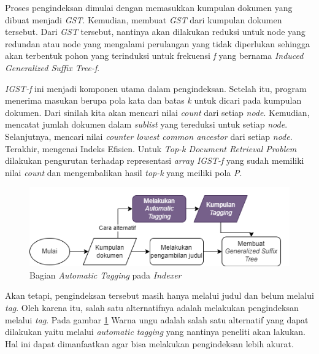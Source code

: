 
Proses pengindeksan dimulai dengan memasukkan kumpulan dokumen yang dibuat menjadi \textit{GST}. Kemudian, membuat \textit{GST} dari kumpulan dokumen tersebut. Dari \textit{GST} tersebut, nantinya akan dilakukan reduksi untuk node yang redundan atau node yang mengalami perulangan yang tidak diperlukan sehingga akan terbentuk pohon yang terinduksi untuk frekuensi \textit{f} yang bernama \textit{Induced Generalized Suffix Tree-f}. 

\textit{IGST-f}  ini menjadi komponen utama dalam pengindeksan. Setelah itu, program menerima masukan berupa pola kata dan batas \textit{k} untuk dicari pada kumpulan dokumen. Dari sinilah kita akan mencari nilai \textit{count} dari setiap \textit{node}. Kemudian, mencatat jumlah dokumen dalam \textit{sublist} yang tereduksi untuk setiap \textit{node}. Selanjutnya, mencari nilai \textit{counter lowest common ancestor} dari setiap \textit{node}. Terakhir, mengenai Indeks Efisien. Untuk \textit{Top-k Document Retrieval Problem} dilakukan pengurutan terhadap representasi \textit{array IGST-f} yang sudah memiliki nilai \textit{count} dan mengembalikan hasil \textit{top-k} yang meiliki pola \textit{P}. \cite{pratama2022igst}

\begin{figure}[H]
    \centering
    \includegraphics[width=1\textwidth]{gambar/Skema singkat General Suffix Tree.png}
    \caption{Bagian \textit{Automatic Tagging} pada \textit{Indexer}}
    \label{gambar:automatic_tagging}
\end{figure}

Akan tetapi, pengindeksan tersebut masih hanya melalui judul dan belum melalui \textit{tag}. Oleh karena itu, salah satu alternatifnya adalah melakukan pengindeksan melalui \textit{tag}. Pada gambar \ref{gambar:automatic_tagging} Warna ungu adalah salah satu alternatif yang dapat dilakukan yaitu melalui \textit{automatic tagging} yang nantinya peneliti akan lakukan. Hal ini dapat dimanfaatkan agar bisa melakukan pengindeksan lebih akurat.
	
